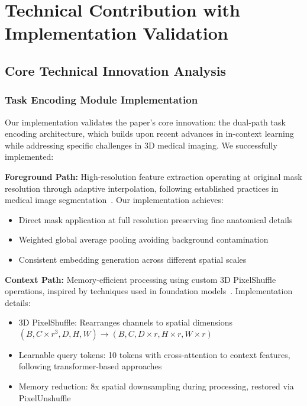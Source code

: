 \section{Technical Contribution with Implementation Validation}
\label{sec:technical_contribution}

\subsection{Core Technical Innovation Analysis}

\subsubsection*{Task Encoding Module Implementation}
Our implementation validates the paper's core innovation: the dual-path task encoding architecture, which builds upon recent advances in in-context learning~\cite{wang2023seggpt, butoi2023universeg} while addressing specific challenges in 3D medical imaging. We successfully implemented:

\textbf{Foreground Path:} High-resolution feature extraction operating at original mask resolution through adaptive interpolation, following established practices in medical image segmentation~\cite{isensee2021nnu}. Our implementation achieves:
\begin{itemize}
    \item Direct mask application at full resolution preserving fine anatomical details
    \item Weighted global average pooling avoiding background contamination
    \item Consistent embedding generation across different spatial scales
\end{itemize}

\textbf{Context Path:} Memory-efficient processing using custom 3D PixelShuffle operations, inspired by techniques used in foundation models~\cite{kirillov2023segmentanything}. Implementation details:
\begin{itemize}
    \item 3D PixelShuffle: Rearranges channels to spatial dimensions $(B, C \times r^3, D, H, W) \rightarrow (B, C, D \times r, H \times r, W \times r)$
    \item Learnable query tokens: 10 tokens with cross-attention to context features, following transformer-based approaches~\cite{zhang2023makes}
    \item Memory reduction: 8x spatial downsampling during processing, restored via PixelUnshuffle
\end{itemize}

